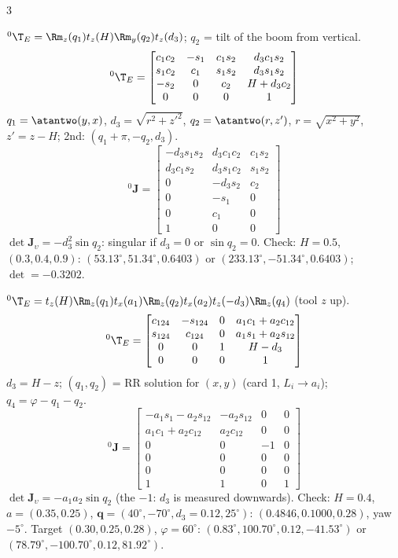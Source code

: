 \begin{multicols}{3}
\begin{fbx}
${}^0\T_E=\Rm_z(q_1)t_z(H)\Rm_y(q_2)t_z(d_3)$; $q_2$ = tilt of the boom from vertical.
{\rbsm\[{}^0\T_E=\begin{bmatrix}c_1c_2&-s_1&c_1s_2&d_3c_1s_2\\s_1c_2&c_1&s_1s_2&d_3s_1s_2\\-s_2&0&c_2&H+d_3c_2\\0&0&0&1\end{bmatrix}\]}
$q_1=\atantwo(y,x)$, $d_3=\sqrt{r^2+z'^2}$, $q_2=\atantwo(r,z')$, $r=\sqrt{x^2+y^2}$, $z'=z-H$; 2nd: $(q_1{+}\pi,-q_2,d_3)$.
{\rbsm\[{}^0\mathbf J=\begin{bmatrix}-d_3s_1s_2&d_3c_1c_2&c_1s_2\\d_3c_1s_2&d_3s_1c_2&s_1s_2\\0&-d_3s_2&c_2\\0&-s_1&0\\0&c_1&0\\1&0&0\end{bmatrix}\]}
$\det\mathbf J_\upsilon=-d_3^2\sin q_2$: singular if $d_3=0$ or $\sin q_2=0$. Check: $H=0.5$, $(0.3,0.4,0.9)$: $(53.13^\circ,51.34^\circ,0.6403)$ or $(233.13^\circ,-51.34^\circ,0.6403)$; $\det=-0.3202$. \chk
\end{fbx}

\begin{fbx}
${}^0\T_E=t_z(H)\Rm_z(q_1)t_x(a_1)\Rm_z(q_2)t_x(a_2)t_z(-d_3)\Rm_z(q_4)$ (tool $z$ up).
{\rbsm\[{}^0\T_E=\begin{bmatrix}c_{124}&-s_{124}&0&a_1c_1+a_2c_{12}\\s_{124}&c_{124}&0&a_1s_1+a_2s_{12}\\0&0&1&H-d_3\\0&0&0&1\end{bmatrix}\]}
$d_3=H-z$; $(q_1,q_2)$ = RR solution for $(x,y)$ (card 1, $L_i\to a_i$); $q_4=\varphi-q_1-q_2$.
{\rbsm\[{}^0\mathbf J=\begin{bmatrix}-a_1s_1-a_2s_{12}&-a_2s_{12}&0&0\\a_1c_1+a_2c_{12}&a_2c_{12}&0&0\\0&0&-1&0\\0&0&0&0\\0&0&0&0\\1&1&0&1\end{bmatrix}\]}
$\det\mathbf J_\upsilon=-a_1a_2\sin q_2$ (the $-1$: $d_3$ is measured downwards). Check: $H=0.4$, $a=(0.35,0.25)$, $\mathbf q=(40^\circ,-70^\circ,d_3{=}0.12,25^\circ)$: $(0.4846,0.1000,0.28)$, yaw $-5^\circ$. Target $(0.30,0.25,0.28)$, $\varphi=60^\circ$: $(0.83^\circ,100.70^\circ,0.12,-41.53^\circ)$ or $(78.79^\circ,-100.70^\circ,0.12,81.92^\circ)$. \chk
\end{fbx}


\end{multicols}

